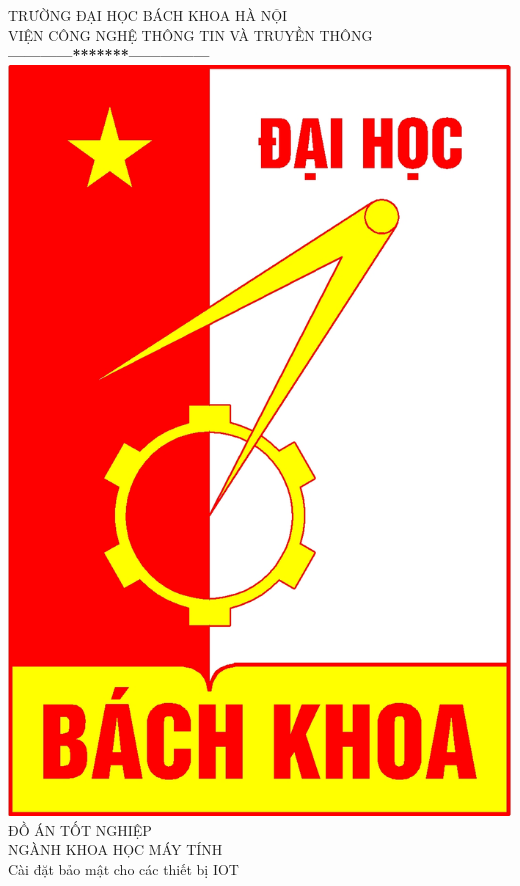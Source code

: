 \documentclass[a4paper,12pt]{report}
\begin{document}
\thispagestyle{empty}
\thisfancypage{
\setlength{\fboxrule}{1pt}
\doublebox}{}

\begin{center}
{\fontsize{16}{19}\selectfont TRƯỜNG ĐẠI HỌC BÁCH KHOA HÀ NỘI\\
VIỆN CÔNG NGHỆ THÔNG TIN VÀ TRUYỀN THÔNG}\\
\textbf{------------*******---------------}\\[1cm]
\includegraphics[scale=0.13]{hust.jpg}\\[1.3cm]
{\fontsize{23}{43}\selectfont ĐỒ ÁN TỐT NGHIỆP}\\[0.1cm]
{\fontsize{25}{10}\selectfont NGÀNH KHOA HỌC MÁY TÍNH}\\[0.9cm]
{\fontsize{20}{24}\selectfont Cài đặt bảo mật cho các thiết bị IOT}\\[2cm]


\end{center}
\end{document}

